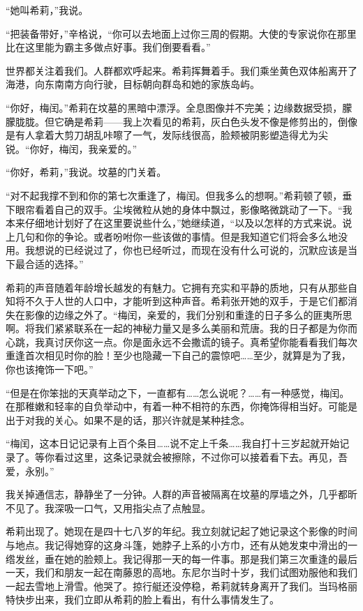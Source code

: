 \documentclass[AutoFakeBold=true]{book}
\begin{document}
``她叫希莉，''我说。

``把装备带好，''辛格说，``你可以去地面上过你三周的假期。大使的专家说你在那里比在这里能为霸主多做点好事。我们倒要看看。''

世界都关注着我们。人群都欢呼起来。希莉挥舞着手。我们乘坐黄色双体船离开了海港，向东南南方向行驶，目标朝向群岛和她的家族岛屿。

\vspace*{1em}

``你好，梅闰。''希莉在坟墓的黑暗中漂浮。全息图像并不完美；边缘数据受损，朦朦胧胧。但它确是希莉——我上次看见的希莉，灰白色头发不像是修剪出的，倒像是有人拿着大剪刀胡乱咔嚓了一气，发际线很高，脸颊被阴影塑造得尤为尖锐。``你好，梅闰，我亲爱的。''

``你好，希莉，''我说。坟墓的门关着。

``对不起我撑不到和你的第七次重逢了，梅闰。但我多么的想啊。''希莉顿了顿，垂下眼帘看着自己的双手。尘埃微粒从她的身体中飘过，影像略微跳动了一下。``我本来仔细地计划好了在这里要说些什么，''她继续道，``以及以怎样的方式来说。说上几句和你的争论。或者吩咐你一些该做的事情。但是我知道它们将会多么地没用。我想说的已经说过了，你也已经听过，而现在没有什么可说的，沉默应该是当下最合适的选择。''

希莉的声音随着年龄增长越发的有魅力。它拥有充实和平静的质地，只有从那些自知将不久于人世的人口中，才能听到这种声音。希莉张开她的双手，于是它们都消失在影像的边缘之外了。``梅闰，亲爱的，我们分别和重逢的日子多么的匪夷所思啊。将我们紧紧联系在一起的神秘力量又是多么美丽和荒唐。我的日子都是为你而心跳，我真讨厌你这一点。你是面永远不会撒谎的镜子。真希望你能看看我们每次重逢首次相见时你的脸！至少也隐藏一下自己的震惊吧……至少，就算是为了我，你也该掩饰一下吧。''

``但是在你笨拙的天真举动之下，一直都有……怎么说呢？……有一种感觉，梅闰。在那稚嫩和轻率的自负举动中，有着一种不相符的东西，你掩饰得相当好。可能是出于对我的关心。如果不是的话，那兴许就是某种挂念。

``梅闰，这本日记记录有上百个条目……说不定上千条……我自打十三岁起就开始记录了。等你看过这里，这条记录就会被擦除，不过你可以接着看下去。再见，吾爱，永别。''

\vspace*{1em}

我关掉通信志，静静坐了一分钟。人群的声音被隔离在坟墓的厚墙之外，几乎都昕不见了。我深吸一口气，又用指尖点了点触显。

希莉出现了。她现在是四十七八岁的年纪。我立刻就记起了她记录这个影像的时间与地点。我记得她穿的这身斗篷，她脖子上系的小方巾，还有从她发束中滑出的一绺发丝，垂在她的脸颊上。我记得那一天的每一件事。那是我们第三次重逢的最后一天，我们和朋友一起在南藤恩的高地。东尼尔当时十岁，我们试图劝服他和我们一起去雪地上滑雪。他哭了。掠行艇还没停稳，希莉就转身离开了我们。当玛格丽特快步出来，我们立即从希莉的脸上看出，有什么事情发生了。
\end{document}
